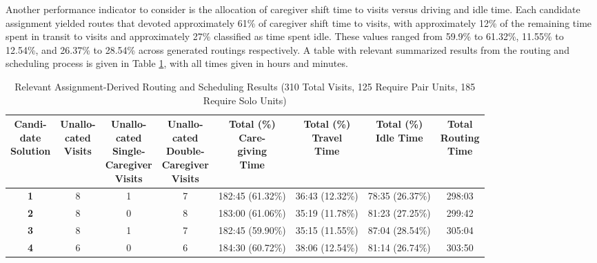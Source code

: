 \documentclass[11pt,twoside]{article}
\numberwithin{Theorem}{section}
\numberwithin{Definition}{section}
\numberwithin{Lemma}{section}
\numberwithin{Algorithm}{section}
\numberwithin{equation}{section}
\begin{document}
Another performance indicator to consider is the allocation of caregiver shift time to visits versus driving and idle time. Each candidate assignment yielded routes that devoted approximately 61\% of caregiver shift time to visits, with approximately 12\% of the remaining time spent in transit to visits and approximately 27\% classified as time spent idle. These values ranged from 59.9\% to 61.32\%, 11.55\% to 12.54\%, and 26.37\% to 28.54\% across generated routings respectively. A table with relevant summarized results from the routing and scheduling process is given in Table \ref{tab:restab}, with all times given in hours and minutes.

\begin{table}[H]
	\begin{center}
		\caption{Relevant Assignment-Derived Routing and Scheduling Results (310 Total Visits, 125 Require Pair Units, 185 Require Solo Units)}
		\label{tab:restab}
		\setlength{\tabcolsep}{3.75pt}
		\begin{tabular}{cccccccc}
			\makecell{Candi-\\date\\Solution} & \makecell{Unallo-\\cated\\Visits} & \makecell{Unallo-\\cated\\Single-\\Caregiver\\Visits} & \makecell{Unallo-\\cated\\Double-\\Caregiver\\Visits} & \makecell{Total (\%)\\Care-\\giving\\Time} & \makecell{Total (\%)\\Travel\\Time} & \makecell{Total (\%)\\Idle Time} & \makecell{Total\\Routing\\Time}\\
			\toprule
			\textbf{1} & 8 & 1 & 7 & 182:45 (61.32\%) & 36:43 (12.32\%) & 78:35 (26.37\%) & 298:03 \\
			\textbf{2} & 8 & 0 & 8 & 183:00 (61.06\%) & 35:19 (11.78\%) & 81:23 (27.25\%) & 299:42 \\
			\textbf{3} & 8 & 1 & 7 & 182:45 (59.90\%) & 35:15 (11.55\%) & 87:04 (28.54\%) & 305:04 \\
			\textbf{4} & 6 & 0 & 6 & 184:30 (60.72\%) & 38:06 (12.54\%) & 81:14 (26.74\%) & 303:50 \\
		\end{tabular}
	\end{center}
\end{table}
\end{document}
